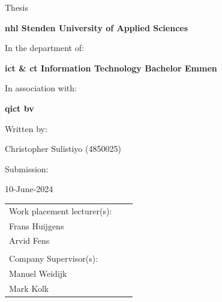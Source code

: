 \begin{center}
    \vspace{0.5cm}
    \large{Thesis}
    \vspace{0.5cm}

    \textbf{\acrshort{nhl} Stenden University of Applied Sciences}

    \vspace{0.5cm}

    In the department of:

    \vspace{0.5cm}

    \textbf{\acrshort{ict} \& \acrshort{ct} Information Technology Bachelor Emmen}

    \vspace{0.5cm}

    In association with:

    \vspace{0.5cm}

    \textbf{\acrlong{qict} \acrshort{bv}}

    \vspace{0.5cm}

    Written by: \vspace{0.5cm}

    Christopher Sulistiyo (4850025) \vspace{0.5cm}

    Submission: \vspace{0.5cm}

    10-June-2024 \vspace{0.5cm} \vspace{0.5cm}

    \vfill
\end{center}
\begin{tabular}{p{7cm}p{7cm}p{5cm} }
    Work placement lecturer(s): \\
    Frans Huijgens              \\
    Arvid Fens                  \\
    \vspace{0.0cm}              \\

    Company Supervisor(s):      \\
    Manuel Weidijk              \\
    Mark Kolk                   \\
\end{tabular}

\vspace{0.5cm}
\addtocounter{page}{-1}